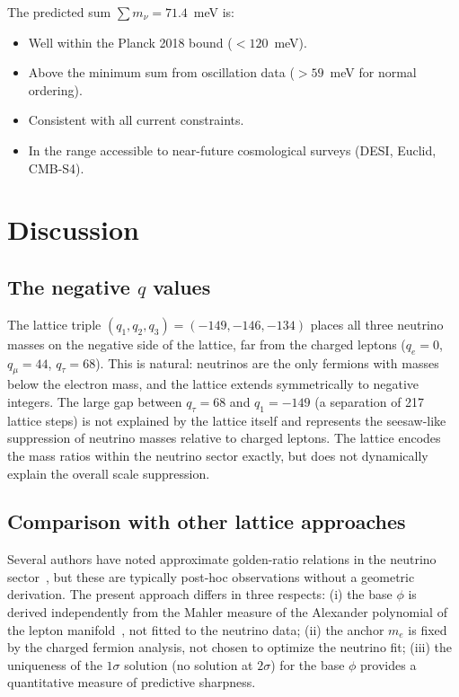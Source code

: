 \documentclass[12pt]{article}
\theoremstyle{definition}
\begin{document}
The predicted sum $\sum m_\nu = 71.4$~meV is:
\begin{itemize}
  \item Well within the Planck 2018 bound ($< 120$~meV).
  \item Above the minimum sum from oscillation data
    ($> 59$~meV for normal ordering).
  \item Consistent with all current constraints.
  \item In the range accessible to near-future cosmological surveys
    (DESI, Euclid, CMB-S4).
\end{itemize}

\section{Discussion}
\label{sec:discussion}

\subsection{The negative $q$ values}

The lattice triple $(q_1, q_2, q_3) = (-149, -146, -134)$ places all
three neutrino masses on the negative side of the lattice, far from
the charged leptons ($q_{e} = 0$, $q_\mu = 44$, $q_\tau = 68$).
This is natural: neutrinos are the only fermions with masses below the
electron mass, and the lattice extends symmetrically to negative
integers. The large gap between $q_\tau = 68$ and $q_1 = -149$
(a separation of 217 lattice steps) is not explained by the lattice
itself and represents the seesaw-like suppression of neutrino masses
relative to charged leptons. The lattice encodes the mass ratios
within the neutrino sector exactly, but does not dynamically explain
the overall scale suppression.

\subsection{Comparison with other lattice approaches}

Several authors have noted approximate golden-ratio relations in the
neutrino sector~\cite{various}, but these are typically post-hoc
observations without a geometric derivation. The present approach
differs in three respects: (i) the base $\phi$ is derived independently
from the Mahler measure of the Alexander polynomial of the lepton
manifold~\cite{Gentry:JKTR}, not fitted to the neutrino data;
(ii) the anchor $m_e$ is fixed by the charged fermion analysis, not
chosen to optimize the neutrino fit; (iii) the uniqueness of the
$1\sigma$ solution (no solution at $2\sigma$) for the base $\phi$
provides a quantitative measure of predictive sharpness.
\end{document}
